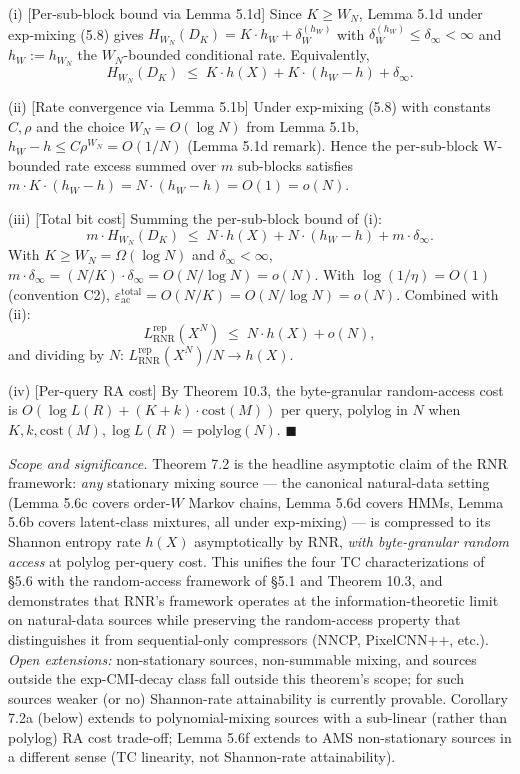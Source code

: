 \documentclass[
]{article}
\begin{document}
(i) [Per-sub-block bound via Lemma 5.1d] Since $K \geq W_N$, Lemma 5.1d
under exp-mixing (5.8) gives
$H_{W_N}(D_K) = K \cdot h_W + \delta_W^{(h_W)}$
with $\delta_W^{(h_W)} \leq \delta_\infty < \infty$ and $h_W := h_{W_N}$
the $W_N$-bounded conditional rate. Equivalently,
\[
H_{W_N}(D_K) \;\leq\; K \cdot h(X) + K \cdot (h_W - h) + \delta_\infty.
\]

(ii) [Rate convergence via Lemma 5.1b] Under exp-mixing (5.8) with
constants $C, \rho$ and the choice $W_N = O(\log N)$ from Lemma 5.1b,
$h_W - h \leq C \rho^{W_N} = O(1/N)$ (Lemma 5.1d
remark). Hence the per-sub-block W-bounded rate excess summed
over $m$ sub-blocks satisfies $m \cdot K \cdot (h_W - h) =
N \cdot (h_W - h) = O(1) = o(N)$.

(iii) [Total bit cost] Summing the per-sub-block bound of (i):
\[
m \cdot H_{W_N}(D_K) \;\leq\; N \cdot h(X) + N \cdot (h_W - h) + m \cdot \delta_\infty.
\]
With $K \geq W_N = \Omega(\log N)$ and $\delta_\infty < \infty$,
$m \cdot \delta_\infty = (N/K) \cdot \delta_\infty = O(N/\log N) = o(N)$.
With $\log(1/\eta) = O(1)$ (convention C2),
$\varepsilon_{\mathrm{ac}}^{\mathrm{total}} = O(N/K) = O(N/\log N) = o(N)$.
Combined with (ii):
\[
L^{\mathrm{rep}}_{\mathrm{RNR}}(X^N) \;\leq\; N \cdot h(X) + o(N),
\]
and dividing by $N$: $L^{\mathrm{rep}}_{\mathrm{RNR}}(X^N) / N \to h(X)$.

(iv) [Per-query RA cost] By Theorem 10.3, the byte-granular
random-access cost is $O(\log L(R) + (K + k) \cdot \mathrm{cost}(M))$
per query, polylog in $N$ when $K, k, \mathrm{cost}(M), \log L(R) =
\mathrm{polylog}(N)$.
\hfill$\blacksquare$

\emph{Scope and significance.} Theorem 7.2 is the headline asymptotic
claim of the RNR framework: \emph{any} stationary mixing source --- the
canonical natural-data setting (Lemma 5.6c covers order-$W$ Markov
chains, Lemma 5.6d covers HMMs, Lemma 5.6b covers latent-class
mixtures, all under exp-mixing) --- is compressed to its Shannon
entropy rate $h(X)$ asymptotically by RNR, \emph{with byte-granular
random access} at polylog per-query cost. This unifies the four
TC characterizations of §5.6 with the random-access framework of
§5.1 and Theorem 10.3, and demonstrates that RNR's framework
operates at the information-theoretic limit on natural-data sources
while preserving the random-access property that distinguishes it
from sequential-only compressors (NNCP, PixelCNN++, etc.).
\emph{Open extensions:} non-stationary sources, non-summable mixing,
and sources outside the exp-CMI-decay class fall outside this
theorem's scope; for such sources weaker (or no) Shannon-rate
attainability is currently provable. Corollary 7.2a (below) extends
to polynomial-mixing sources with a sub-linear (rather than polylog)
RA cost trade-off; Lemma 5.6f extends to AMS non-stationary sources
in a different sense (TC linearity, not Shannon-rate attainability).
\end{document}
